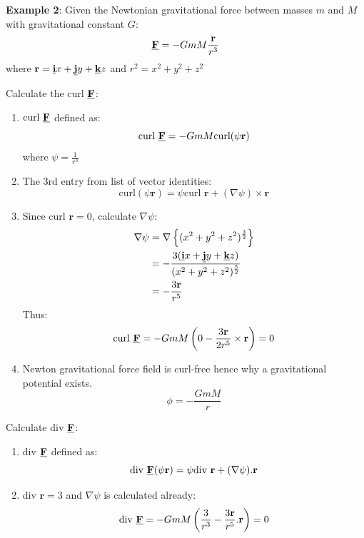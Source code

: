 \documentclass[10pt,a4paper]{article}
\begin{document}
\textbf{Example 2}: Given the Newtonian gravitational force between masses $m$ and $M$ with
gravitational constant $G$:
$$
    \textbf{\underline{F}}=-GmM\frac{\textbf{r}}{r^3}
$$
where $\textbf{r}=\textbf{\underline{i}}x+\textbf{\underline{j}}y+\textbf{\underline{k}}z$ and
$r^2=x^2+y^2+z^2$

Calculate the curl $\textbf{\underline{F}}$:
\begin{enumerate}
    \item $\text{curl }\textbf{\underline{F}}$ defined as:
    $$
    \text{curl }\textbf{\underline{F}} = -GmM\text{curl}(\psi \textbf{r})
    $$ 
    where $\psi = \frac{1}{r^3}$

    \item The 3rd entry from list of vector identities:
    $$
        \text{curl}(\psi \textbf{r}) = \psi\text{curl }\textbf{r} + (\nabla\psi)\times \textbf{r}
    $$

    \item Since $\text{curl }\textbf{r}=0$, calculate $\nabla\psi$:
    \begin{align*}
        \nabla\psi &= \nabla\left\{(x^2+y^2+z^2)^{\frac{3}{2}}\right\} \\
        &= -\frac{3(\textbf{\underline{i}}x+\textbf{\underline{j}}y+\textbf{\underline{k}}z)}{(x^2+y^2+z^2)^{\frac{5}{2}}} \\
        &= -\frac{3 \textbf{r}}{r^5}
    \end{align*}
    Thus:
    $$
        \text{curl }\textbf{\underline{F}} = -GmM \left( 0 - \frac{3 \textbf{r}}{2r^5} \times \textbf{r} \right) = 0
    $$

    \item Newton gravitational force field is curl-free hence why a gravitational potential exists.
    $$
        \phi = -\frac{GmM}{r}
    $$
\end{enumerate}

Calculate div $\textbf{\underline{F}}$:
\begin{enumerate}
    \item div $\textbf{\underline{F}}$ defined as:
    $$
        \text{div }\textbf{\underline{F}}(\psi \textbf{r}) = \psi \text{div }\textbf{r}+(\nabla\psi).\textbf{r}
    $$

    \item div $\textbf{r} = 3$ and $\nabla \psi$ is calculated already:
    $$
        \text{div }\textbf{\underline{F}} = -GmM\left(\frac{3}{r^3}-\frac{3 \textbf{r}}{r^5}.\textbf{r}\right) = 0
    $$
\end{enumerate}
\end{document}
